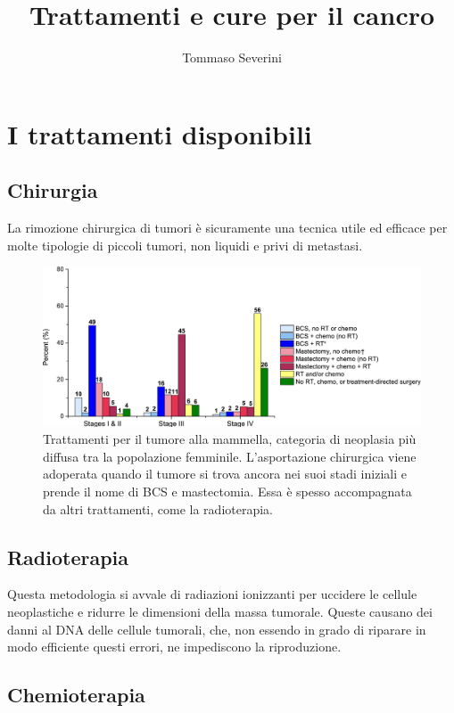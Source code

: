 \documentclass[11pt]{article}
\title{Trattamenti e cure per il cancro}
\author{Tommaso Severini}
\date{}
\begin{document}
	\maketitle


\section*{I trattamenti disponibili}

\subsection*{Chirurgia}

La rimozione chirurgica di tumori è sicuramente una tecnica utile ed efficace per molte tipologie di piccoli tumori, non liquidi e privi di metastasi.

\begin{figure}[h]
	\centering
	\includegraphics[width=0.7\linewidth]{tumore_seno}
	\caption{Trattamenti per il tumore alla mammella, categoria di neoplasia più diffusa tra la popolazione femminile.\cite{di2021numeri} L'asportazione chirurgica viene adoperata quando il tumore si trova ancora nei suoi stadi iniziali e prende il nome di BCS e mastectomia. Essa è spesso accompagnata da altri trattamenti, come la radioterapia.\cite{miller2019cancer}}
	\label{fig:tumoreseno}
\end{figure}


\subsection*{Radioterapia}

Questa metodologia si avvale di radiazioni ionizzanti per uccidere le cellule neoplastiche e ridurre le dimensioni della massa tumorale. Queste causano dei danni al DNA delle cellule tumorali, che, non essendo in grado di riparare in modo efficiente questi errori, ne impediscono la riproduzione.


\subsection*{Chemioterapia}
\end{document}
